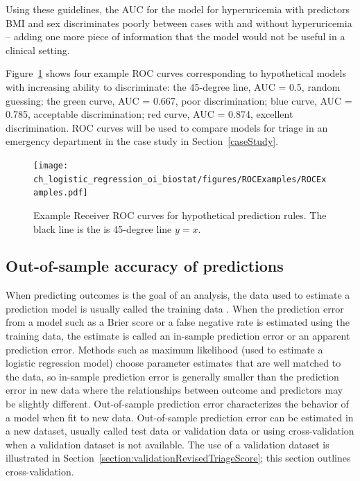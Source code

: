 Using these guidelines, the AUC for the model for hyperuricemia with predictors BMI and sex discriminates poorly between cases with and without hyperuricemia -- adding one more piece of information that the model would not be useful in a clinical setting.

Figure~\ref{figure:ROCExamples} shows four example ROC curves corresponding to hypothetical models with increasing ability to discriminate: the 45-degree line, AUC = 0.5, random guessing; the green curve, AUC = 0.667, poor discrimination; blue curve, AUC = 0.785, acceptable discrimination; red curve, AUC = 0.874, excellent discrimination. ROC curves will be used to compare models for triage in an emergency department in the case study in Section~\ref{caseStudy}.

\begin{figure}[!tbh]
  \centering
  \texttt{[image: ch\_logistic\_regression\_oi\_biostat/figures/ROCExamples/ROCExamples.pdf]}
    \caption{Example Receiver ROC curves for hypothetical prediction rules. The black line is the is 45-degree line $y = x$.}
    \label{figure:ROCExamples}
\end{figure}



\subsection{Out-of-sample accuracy of predictions}
\label{section:outOfSamplePredictionAccuracy} 

When predicting outcomes is the goal of an analysis, the data used to estimate a prediction model is usually called the training data . When the prediction error from a model such as a Brier score or a false negative rate is estimated using the training data, the estimate is called an in-sample prediction error or an apparent prediction error. Methods such as maximum likelihood (used to estimate a logistic regression model) choose parameter estimates that are well matched to the data, so in-sample prediction error is generally smaller than the prediction error in new data where the relationships between outcome and predictors may be slightly different.  Out-of-sample prediction error characterizes the behavior of a model when fit to new data.  Out-of-sample prediction error can be estimated in a new dataset, usually called test data  or validation data or using cross-validation when a validation dataset is not available.  The use of a validation dataset is illustrated in Section~\ref{section:validationRevisedTriageScore}; this section outlines cross-validation. 

